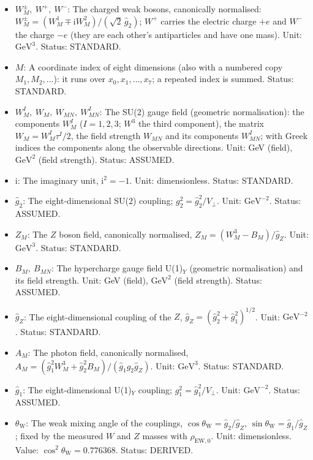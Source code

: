 \documentclass[
  10pt,
]{article}
\providecommand{\tightlist}{%
  \setlength{\itemsep}{0pt}\setlength{\parskip}{0pt}}
\begin{document}
\begin{itemize}
\tightlist
\item
  \(W^\pm_M,\ W^+,\ W^-\): The charged weak bosons, canonically
  normalised:
  \(W^\pm_M = (W^1_M \mp \mathrm{i}W^2_M)/(\sqrt2\,\hat g_2)\); \(W^+\)
  carries the electric charge \(+e\) and \(W^-\) the charge \(-e\) (they
  are each other's antiparticles and have one mass). Unit:
  \(\mathrm{GeV}^{3}\). Status: STANDARD.
\item
  \(M\): A coordinate index of eight dimensions (also with a numbered
  copy \(M_1, M_2, \dots\)): it runs over \(x_0, x_1, \dots, x_7\); a
  repeated index is summed. Status: STANDARD.
\item
  \(W^I_M,\ W_M,\ W_{MN},\ W^I_{MN}\): The SU(2) gauge field (geometric
  normalisation): the components \(W^I_M\) (\(I = 1, 2, 3\); \(W^3\) the
  third component), the matrix \(W_M = W^I_M\tau^I/2\), the field
  strength \(W_{MN}\) and its components \(W^I_{MN}\); with Greek
  indices the components along the observable directions. Unit: GeV
  (field), \(\mathrm{GeV}^{2}\) (field strength). Status: ASSUMED.
\item
  \(\mathrm{i}\): The imaginary unit, \(\mathrm{i}^2 = -1\). Unit:
  dimensionless. Status: STANDARD.
\item
  \(\hat g_2\): The eight-dimensional SU(2) coupling;
  \(g_2^2 = \hat g_2^2/V_\perp\). Unit: \(\mathrm{GeV}^{-2}\). Status:
  ASSUMED.
\item
  \(Z_M\): The \(Z\) boson field, canonically normalised,
  \(Z_M = (W^3_M - B_M)/\hat g_Z\). Unit: \(\mathrm{GeV}^{3}\). Status:
  STANDARD.
\item
  \(B_M,\ B_{MN}\): The hypercharge gauge field U(1)\(_Y\) (geometric
  normalisation) and its field strength. Unit: GeV (field),
  \(\mathrm{GeV}^{2}\) (field strength). Status: ASSUMED.
\item
  \(\hat g_Z\): The eight-dimensional coupling of the \(Z\),
  \(\hat g_Z = (\hat g_2^2 + \hat g_1^2)^{1/2}\). Unit:
  \(\mathrm{GeV}^{-2}\). Status: STANDARD.
\item
  \(A_M\): The photon field, canonically normalised,
  \(A_M = (\hat g_1^2W^3_M + \hat g_2^2B_M)/(\hat g_1\hat g_2\hat g_Z)\).
  Unit: \(\mathrm{GeV}^{3}\). Status: STANDARD.
\item
  \(\hat g_1\): The eight-dimensional U(1)\(_Y\) coupling;
  \(g_1^2 = \hat g_1^2/V_\perp\). Unit: \(\mathrm{GeV}^{-2}\). Status:
  ASSUMED.
\item
  \(\theta_{\mathrm{W}}\): The weak mixing angle of the couplings,
  \(\cos\theta_{\mathrm{W}} = \hat g_2/\hat g_Z\),
  \(\sin\theta_{\mathrm{W}} = \hat g_1/\hat g_Z\); fixed by the measured
  \(W\) and \(Z\) masses with \(\rho_{\mathrm{EW},0}\). Unit:
  dimensionless. Value: \(\cos^2\theta_{\mathrm{W}} = 0.776368\).
  Status: DERIVED.
\end{itemize}
\end{document}
